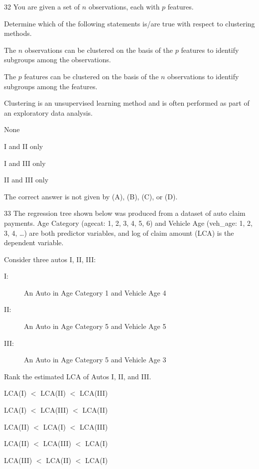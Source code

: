\begin{question}{32}
You are given a set of $n$ observations, each with $p$ features.

Determine which of the following statements is/are true with respect to clustering methods.
\begin{statements}
\item The $n$ observations can be clustered on the basis of the $p$ features to identify subgroups among the observations.
\item The $p$ features can be clustered on the basis of the $n$ observations to identify subgroups among the features.
\item Clustering is an unsupervised learning method and is often performed as part of an exploratory data analysis.
\end{statements}

\begin{choices}
\item None
\item I and II only
\item I and III only
\item II and III only
\item The correct answer is not given by (A), (B), (C), or (D).
\end{choices}
\end{question}

\begin{question}{33}
The regression tree shown below was produced from a dataset of auto claim payments. Age Category (agecat: 1, 2, 3, 4, 5, 6) and Vehicle Age (veh\_age: 1, 2, 3, 4, \ldots) are both predictor variables, and log of claim amount (LCA) is the dependent variable.


Consider three autos I, II, III:
\begin{description}
\item[I:] An Auto in Age Category 1 and Vehicle Age 4
\item[II:] An Auto in Age Category 5 and Vehicle Age 5
\item[III:] An Auto in Age Category 5 and Vehicle Age 3
\end{description}

Rank the estimated LCA of Autos I, II, and III.

\begin{choices}
\item LCA(I) $<$ LCA(II) $<$ LCA(III)
\item LCA(I) $<$ LCA(III) $<$ LCA(II)
\item LCA(II) $<$ LCA(I) $<$ LCA(III)
\item LCA(II) $<$ LCA(III) $<$ LCA(I)
\item LCA(III) $<$ LCA(II) $<$ LCA(I)
\end{choices}
\end{question}

